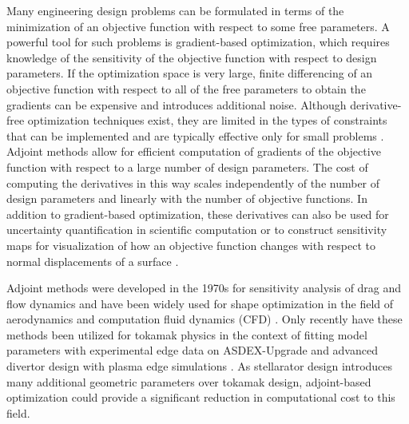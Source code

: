 \documentclass[aps,unsortedaddress]{revtex4-1}
\begin{document}
Many engineering design problems can be formulated in terms of the minimization of an objective function with respect to some free parameters. A powerful tool for such problems is gradient-based optimization, which requires knowledge of the sensitivity of the objective function with respect to design parameters. If the optimization space is very large, finite differencing of an objective function with respect to all of the free parameters to obtain the gradients can be expensive and introduces additional noise. Although derivative-free optimization techniques exist, they are limited in the types of constraints that can be implemented and are typically effective only for small problems \cite{Nocedal2006}. Adjoint methods allow for efficient computation of gradients of the objective function with respect to a large number of design parameters. The cost of computing the derivatives in this way scales independently of the number of design parameters and linearly with the number of objective functions. In addition to gradient-based optimization, these derivatives can also be used for uncertainty quantification in scientific computation \cite{Roy2011} or to construct sensitivity maps for visualization of how an objective function changes with respect to normal displacements of a surface \cite{Othmer2008,Othmer2014}. 

Adjoint methods were developed in the 1970s for sensitivity analysis of drag and flow dynamics \cite{Pironneau1974} and have been widely used for shape optimization in the field of aerodynamics and computation fluid dynamics (CFD) \cite{Kuruvila1995,Jameson1998,Anderson1999,Othmer2008,Othmer2014}. Only recently have these methods been utilized for tokamak physics in the context of fitting model parameters with experimental edge data on ASDEX-Upgrade \cite{Kim2001} and advanced divertor design with plasma edge simulations \cite{Baelmans2017}. As stellarator design introduces many additional geometric parameters over tokamak design, adjoint-based optimization could provide a significant reduction in computational cost to this field. 

\end{document}
